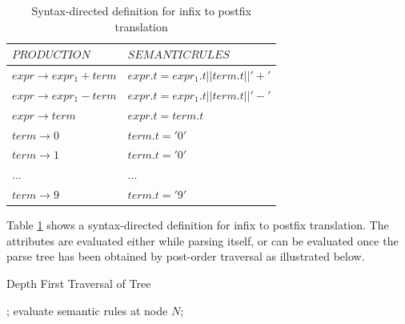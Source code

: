 \documentclass[12pt]{article}
\begin{document}
		\begin{table}[h!]
		  	\begin{tabular}{|l|l|}

		  		\hline
		  		$PRODUCTION$ & $SEMANTIC RULES$\\

		  		\hline \hline

		    	$expr \rightarrow expr_{1} + term$ & $expr.t = expr_{1}.t || term.t || '+'$\\
		    	$expr \rightarrow expr_{1} - term$ & $expr.t = expr_{1}.t || term.t || '-'$\\
		    	$expr \rightarrow term$ & $expr.t = term.t$\\
				$term \rightarrow  0$ & $term.t = '0'$\\
				$term \rightarrow  1$ & $term.t = '0'$\\
				$...$ & $...$ \\
				$term \rightarrow  9$ & $term.t = '9'$\\
				\hline

		  	\end{tabular}
		  	\centering
		  	\caption{Syntax-directed definition for infix to postfix translation}
		  	\label{tab:table1}
		\end{table}

		Table \ref{tab:table1} shows a syntax-directed definition for infix to postfix translation. The attributes are evaluated either while parsing itself, or can be evaluated once the parse tree has been obtained by post-order traversal as illustrated below.

		\begin{algorithm}[h!]
			\caption{Depth First Traversal of Tree}
			\label{alg:alg1}
			\begin{algorithmic}

					\State \Call{visit}{$C$};
					\State evaluate semantic rules at node $N$;
				\EndFor
			\EndFunction
			\end{algorithmic}
		\end{algorithm}
\end{document}
